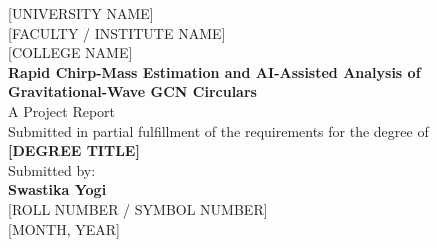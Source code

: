 \begin{titlepage}
    \centering
    \vspace*{1cm}
    {\large [UNIVERSITY NAME]} \\ %
    {\large [FACULTY / INSTITUTE NAME]} \\ %
    {\large [COLLEGE NAME]} \\ %

    \vspace{2cm}
    {\Large \bfseries Rapid Chirp-Mass Estimation and AI-Assisted Analysis of \\ Gravitational-Wave GCN Circulars} \\ %
    \vspace{0.5cm}
    {\large A Project Report} \\

    \vspace{2cm}
    Submitted in partial fulfillment of the requirements for the degree of \\ %
    {\bfseries [DEGREE TITLE]} \\ %

    \vspace{2cm}
    {\large Submitted by:} \\
    {\bfseries Swastika Yogi} \\ %
    {[ROLL NUMBER / SYMBOL NUMBER]} \\ %

    \vspace{2cm}
    {\large [MONTH, YEAR]} %

    \vfill
\end{titlepage}
